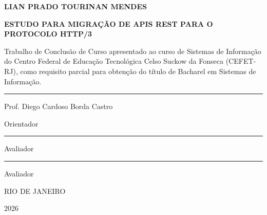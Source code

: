 \begin{titlepage}
\centering
\vspace*{1.5cm}
{\bfseries\large LIAN PRADO TOURINAN MENDES\par}
\vspace{1cm}
{\bfseries ESTUDO PARA MIGRAÇÃO DE APIS REST PARA O PROTOCOLO HTTP/3\par}
\vspace{1.5cm}
\begin{minipage}{0.85\textwidth}
\raggedright
Trabalho de Conclusão de Curso apresentado ao curso de Sistemas de Informação do Centro Federal de Educação Tecnológica Celso Suckow da Fonseca (CEFET-RJ), como requisito parcial para obtenção do título de Bacharel em Sistemas de Informação.
\end{minipage}
\vfill
\rule{0.55\textwidth}{0.4pt}\par
Prof. Diego Cardoso Borda Castro\par
Orientador\par
\vspace{1.5cm}
\rule{0.55\textwidth}{0.4pt}\par
[AVALIADOR 1]\par
Avaliador\par
\vspace{1.5cm}
\rule{0.55\textwidth}{0.4pt}\par
[AVALIADOR 2]\par
Avaliador\par
\vfill
RIO DE JANEIRO\par
2026\par
\end{titlepage}
